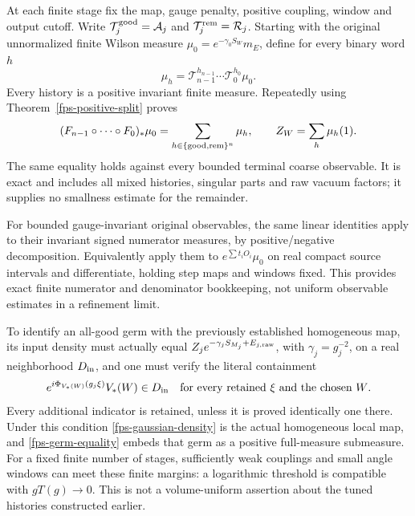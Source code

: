 \documentclass[11pt]{article}
\theoremstyle{remark}
\begin{document}
At each finite stage fix the map, gauge penalty, positive coupling,
window and output cutoff. Write
\(\mathcal T_j^{\rm good}=\mathcal A_j\) and
\(\mathcal T_j^{\rm rem}=\mathcal R_j\).
Starting with the original unnormalized finite Wilson measure
\(\mu_0=e^{-\gamma_0S_W}m_E\), define for every binary word \(h\)
\[
 \mu_h=\mathcal T_{n-1}^{h_{n-1}}\cdots
                         \mathcal T_0^{h_0}\mu_0.
\]
Every history is a positive invariant finite measure. Repeatedly using
Theorem~\ref{fps-positive-split} proves
\begin{equation}
 (F_{n-1}\circ\cdots\circ F_0)_*\mu_0
     =\sum_{h\in\{{\rm good},{\rm rem}\}^n}\mu_h,
 \qquad Z_W=\sum_h\mu_h(1).
 \label{fps-history-identity}
\end{equation}
The same equality holds against every bounded terminal coarse
observable. It is exact and includes all mixed histories, singular
parts and raw vacuum factors; it supplies no smallness estimate for
the remainder.

For bounded gauge-invariant original observables, the same linear
identities apply to their invariant signed numerator measures, by
positive/negative decomposition. Equivalently apply them to
\(e^{\sum t_iO_i}\mu_0\) on real compact source intervals and
differentiate, holding step maps and windows fixed. This provides
exact finite numerator and denominator bookkeeping, not uniform
observable estimates in a refinement limit.

To identify an all-good germ with the previously established
homogeneous map, its input density must actually equal
\(Z_j e^{-\gamma_jS_{M_j}+E_{j,\rm raw}}\), with \(\gamma_j=g_j^{-2}\), on a real neighborhood
\(D_{\rm in}\), and one must verify the literal containment
\begin{equation}
 e^{i\Phi_{V_*(W)}(g_j\xi)}V_*(W)\in D_{\rm in}
 \quad\hbox{for every retained \(\xi\) and the chosen \(W\)}.
 \label{fps-literal-containment}
\end{equation}
Every additional indicator is retained, unless it is proved identically
one there. Under this condition \eqref{fps-gaussian-density} is the
actual homogeneous local map, and \eqref{fps-germ-equality} embeds that
germ as a positive full-measure submeasure. For a fixed finite number
of stages, sufficiently weak couplings and small angle windows can meet
these finite margins: a logarithmic threshold is compatible with
\(gT(g)\to0\). This is not a volume-uniform assertion about the tuned
histories constructed earlier.
\end{document}
